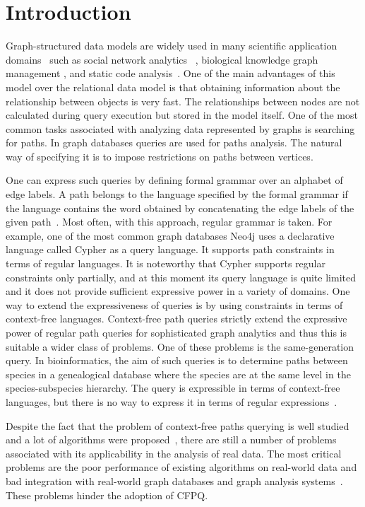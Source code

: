 \section*{Introduction}\label{sec:introduction}

Graph-structured data models are widely used in many scientific application domains~\cite{robinson2015graph} such as social network analytics ~\cite{10.1145/2463664.2465216},  biological knowledge graph management \cite{rna}, and static code analysis~\cite{10.1145/2499370.2462159}. One of the main advantages of this model over the relational data model is that obtaining information about the relationship between objects is very fast. The relationships between nodes are not calculated during query execution but stored in the model itself. One of the most common tasks associated with analyzing data represented by graphs is searching for paths. In graph databases queries are used for paths analysis. The natural way of specifying it is to impose restrictions on paths between vertices.

One can express such queries by defining formal grammar over an alphabet of edge labels. A path belongs to the language specified by the formal grammar if the language contains the word obtained by concatenating the edge labels of the given path~\cite{arcbool}. Most often, with this approach, regular grammar is taken. For example, one of the most common graph databases Neo4j uses a declarative language called Cypher as a query language. It supports path constraints in terms of regular languages. It is noteworthy that Cypher supports regular constraints only partially, and at this moment its query language is quite limited and it does not provide sufficient expressive power in a variety of domains. One way to extend the expressiveness of queries is by using constraints in terms of context-free languages. Context-free path queries strictly extend the expressive power of regular path queries for sophisticated graph analytics and thus this is suitable a wider class of problems. One of these problems is the same-generation query. In bioinformatics, the aim of such queries is to determine paths between species in a genealogical database where the species are at the same level in the species-subspecies hierarchy. The query is expressible in terms of context-free languages, but there is no way to express it in terms of regular expressions~\cite{10.1007/978-3-319-91662-0_17}. 

Despite the fact that the problem of context-free paths querying is well studied and a lot of algorithms were proposed~\cite{10.1145/3210259.3210264, zhang2016contextfree, hellings2016querying, medeiros2020algorithm}, there are still a number of problems associated with its applicability in the analysis of real data. The most critical problems are the poor performance of existing algorithms on real-world data and bad integration with  real-world graph databases and graph analysis systems~\cite{10.1145/3335783.3335791}. These problems hinder the adoption of CFPQ.

